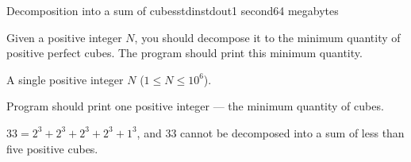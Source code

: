 \begin{problem}{Decomposition into a sum of cubes}{stdin}{stdout}{1 second}{64 megabytes}

Given a positive integer $N$, you should decompose it to the minimum quantity of positive perfect cubes. The program should print this minimum quantity.

\InputFile
A single positive integer $N$ ($1\leq N\leq 10^6$).

\OutputFile
Program should print one positive integer ---  the minimum quantity of cubes.

\Examples

\begin{example}
%
\end{example}

\Note
$33=2^3+2^3+2^3+2^3+1^3$, and 33 cannot be decomposed into a sum of less than five positive cubes.

\end{problem}
